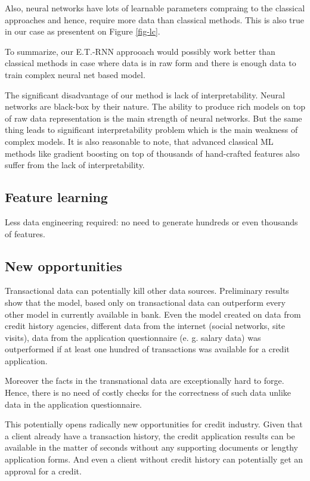 \documentclass[sigconf]{acmart}
\begin{document}
Also, neural networks have lots of learnable parameters compraing to the classical approaches and hence, require more data than classical methods. This is also true in our case as presentent on Figure \ref{fig-lc}.

To summarize, our E.T.-RNN approoach would possibly work better than classical methods in case where data is in raw form and there is enough data to train complex neural net based model.

The significant disadvantage of our method is lack of interpretability. Neural networks are black-box by their nature. The ability to produce rich models on top of raw data representation is the main strength of neural networks. But the same thing leads to significant interpretability problem which is the main weakness of complex models. It is also reasonable to note, that advanced classical ML methods like gradient boosting on top of thousands of hand-crafted features also suffer from the lack of interpretability.

\subsection{Feature learning}

Less data engineering required: no need to generate hundreds or even thousands of features.

\subsection{New opportunities}

Transactional data can potentially kill other data sources. Preliminary results show that the model, based only on transactional data can outperform every other model in currently available in bank. Even the model created on data from credit history agencies, different data from the internet (social networks, site visits), data from the application questionnaire (e. g. salary data) was outperformed if at least one hundred of transactions was available for a credit application.

Moreover the facts in the transnational data are exceptionally hard to forge. Hence, there is no need of costly checks for the correctness of such data unlike data in the application questionnaire.

This potentially opens radically new opportunities for credit industry. Given that a client already have a transaction history, the credit application results can be available in the matter of seconds without any supporting documents or lengthy application forms. And even a client without credit history can potentially get an approval for a credit.
\end{document}
